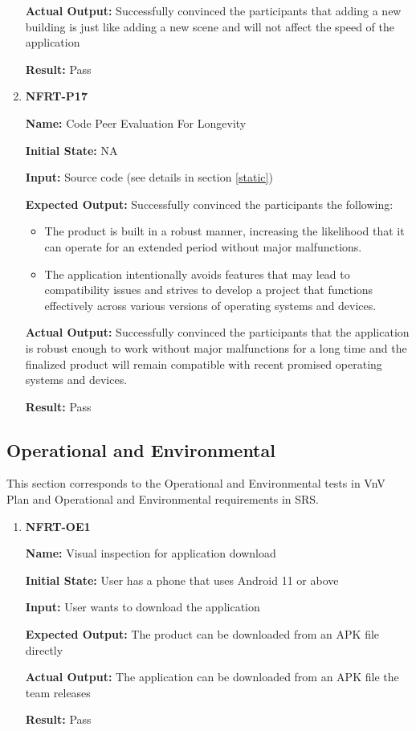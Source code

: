 \documentclass[12pt, titlepage]{article}
\begin{document}
\begin{enumerate}
\textbf{Actual Output:} Successfully convinced the participants that adding a new building is just like adding a new scene and will not affect the speed of the application

\textbf{Result:} Pass

\item \textbf{NFRT-P17}

\textbf{Name:} Code Peer Evaluation For Longevity

\textbf{Initial State:} NA

\textbf{Input:} Source code (see details in section \ref{static})

\textbf{Expected Output:} Successfully convinced the participants the following:
\begin{itemize} 
  \item The product is built in a robust manner, increasing the likelihood that it can operate for an extended period without major malfunctions.
  \item The application intentionally avoids features that may lead to compatibility issues and strives to develop a project that functions effectively across various versions of operating systems and devices.
\end{itemize}

\textbf{Actual Output:} Successfully convinced the participants that the application is robust enough to work without major malfunctions for a long time and the finalized product will remain compatible with recent promised operating systems and devices.

\textbf{Result:} Pass
\end{enumerate}
\subsection{Operational and Environmental}
This section corresponds to the Operational and Environmental tests in VnV Plan and Operational and Environmental requirements in SRS.
\begin{enumerate}
\item \textbf{NFRT-OE1}

\textbf{Name:} Visual inspection for application download

\textbf{Initial State:} User has a phone that uses Android 11 or above

\textbf{Input:} User wants to download the application

\textbf{Expected Output:} The product can be downloaded from an APK file directly

\textbf{Actual Output:} The application can be downloaded from an APK file the team releases

\textbf{Result:} Pass
\end{enumerate}
\end{document}
